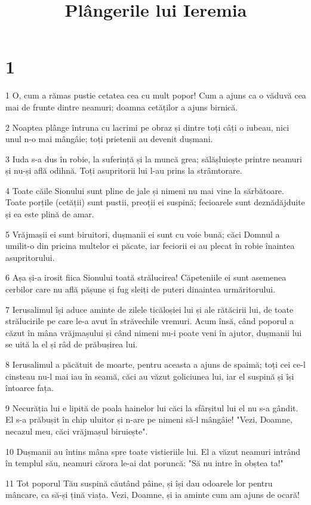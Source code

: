 

\title{Plângerile lui Ieremia}


\chapter{1}

\par 1 O, cum a rămas pustie cetatea cea cu mult popor! Cum a ajuns ca o văduvă cea mai de frunte dintre neamuri; doamna cetăților a ajuns birnică.
\par 2 Noaptea plânge întruna cu lacrimi pe obraz și dintre toți câți o iubeau, nici unul n-o mai mângâie; toți prietenii au devenit dușmani.
\par 3 Iuda s-a dus în robie, la suferință și la muncă grea; sălășluiește printre neamuri și nu-și află odihnă. Toți asupritorii lui l-au prins la strâmtorare.
\par 4 Toate căile Sionului sunt pline de jale și nimeni nu mai vine la sărbătoare. Toate porțile (cetății) sunt pustii, preoții ei suspină; fecioarele sunt deznădăjduite și ea este plină de amar.
\par 5 Vrăjmașii ei sunt biruitori, dușmanii ei sunt cu voie bună; căci Domnul a umilit-o din pricina multelor ei păcate, iar feciorii ei au plecat în robie înaintea asupritorului.
\par 6 Așa și-a irosit fiica Sionului toată strălucirea! Căpeteniile ei sunt asemenea cerbilor care nu află pășune și fug sleiți de puteri dinaintea urmăritorului.
\par 7 Ierusalimul își aduce aminte de zilele ticăloșiei lui și ale rătăcirii lui, de toate strălucirile pe care le-a avut în străvechile vremuri. Acum însă, când poporul a căzut în mâna vrăjmașului și când nimeni nu-i poate veni în ajutor, dușmanii lui se uită la el și râd de prăbușirea lui.
\par 8 Ierusalimul a păcătuit de moarte, pentru aceasta a ajuns de spaimă; toți cei ce-l cinsteau nu-l mai iau în seamă, căci au văzut goliciunea lui, iar el suspină și își întoarce fața.
\par 9 Necurăția lui e lipită de poala hainelor lui căci la sfârșitul lui el nu s-a gândit. El s-a prăbușit în chip uluitor și n-are pe nimeni să-l mângâie! "Vezi, Doamne, necazul meu, căci vrăjmașul biruiește".
\par 10 Dușmanii au întins mâna spre toate vistieriile lui. El a văzut neamuri intrând în templul său, neamuri cărora le-ai dat poruncă: "Să nu intre în obștea ta!"
\par 11 Tot poporul Tău suspină căutând pâine, și își dau odoarele lor pentru mâncare, ca să-și țină viața. Vezi, Doamne, și ia aminte cum am ajuns de ocară!
